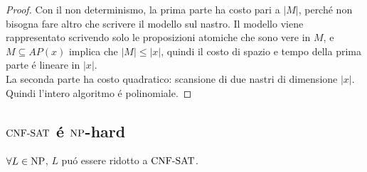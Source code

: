 \begin{proof}
Con il non determinismo, la prima parte ha costo pari a $|M|$, 
perché non bisogna fare altro che scrivere il modello sul nastro.
Il modello viene rappresentato scrivendo solo le proposizioni atomiche che sono vere in $M$, 
e $M \subseteq AP(x)$ implica che $|M| \leq |x|$, quindi il costo di spazio e tempo della prima parte é lineare in $|x|$. \\

La seconda parte ha costo quadratico: scansione di due nastri di dimensione $|x|$.\\

Quindi l'intero algoritmo é polinomiale.
\end{proof}


\newpage
\subsection{$\text{CNF-SAT}$ é $\text{NP}$-hard}
$\forall L \in \text{NP}$, $L$ puó essere ridotto a $\text{CNF-SAT}$.
